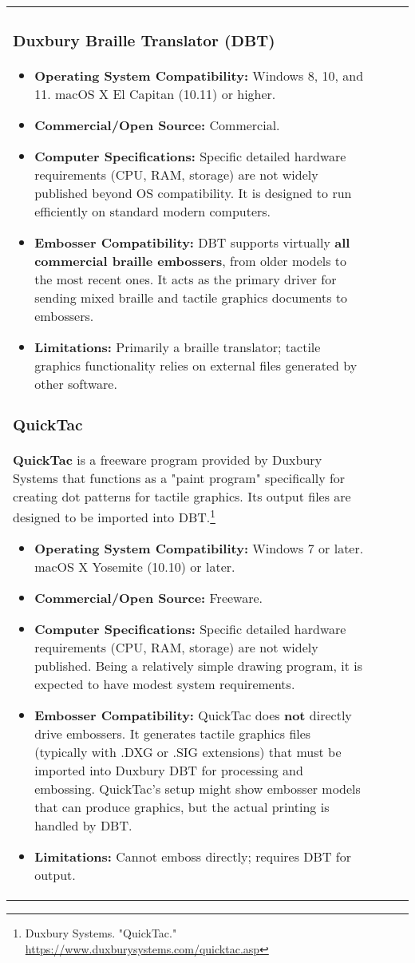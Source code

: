 \begin{longtable}{|l|l|l|l|}
{\subsubsection{Duxbury Braille Translator (DBT)}
\begin{itemize}
    \item \textbf{Operating System Compatibility:} Windows 8, 10, and 11. macOS X El Capitan (10.11) or higher.
    \item \textbf{Commercial/Open Source:} Commercial.
    \item \textbf{Computer Specifications:} Specific detailed hardware requirements (CPU, RAM, storage) are not widely published beyond OS compatibility. It is designed to run efficiently on standard modern computers.
    \item \textbf{Embosser Compatibility:} DBT supports virtually \textbf{all commercial braille embossers}, from older models to the most recent ones. It acts as the primary driver for sending mixed braille and tactile graphics documents to embossers.
    \item \textbf{Limitations:} Primarily a braille translator; tactile graphics functionality relies on external files generated by other software.
\end{itemize}

\subsubsection{QuickTac}
\textbf{QuickTac} is a freeware program provided by Duxbury Systems that functions as a "paint program" specifically for creating dot patterns for tactile graphics. Its output files are designed to be imported into DBT.\footnote{Duxbury Systems. "QuickTac." \url{https://www.duxburysystems.com/quicktac.asp}}

\begin{itemize}
    \item \textbf{Operating System Compatibility:} Windows 7 or later. macOS X Yosemite (10.10) or later.
    \item \textbf{Commercial/Open Source:} Freeware.
    \item \textbf{Computer Specifications:} Specific detailed hardware requirements (CPU, RAM, storage) are not widely published. Being a relatively simple drawing program, it is expected to have modest system requirements.
    \item \textbf{Embosser Compatibility:} QuickTac does \textbf{not} directly drive embossers. It generates tactile graphics files (typically with .DXG or .SIG extensions) that must be imported into Duxbury DBT for processing and embossing. QuickTac's setup might show embosser models that can produce graphics, but the actual printing is handled by DBT.
    \item \textbf{Limitations:} Cannot emboss directly; requires DBT for output.
\end{itemize}

}
\end{longtable}
